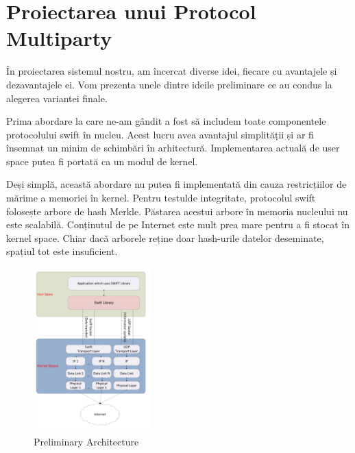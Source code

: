
\section{Proiectarea unui Protocol Multiparty}
\label{sec:multiparty:design}


În proiectarea sistemul nostru, am încercat diverse idei, fiecare cu
avantajele și dezavantajele ei. Vom prezenta unele dintre ideile
preliminare ce au condus la alegerea variantei finale.

Prima abordare la care ne-am gândit a fost să includem toate componentele
protocolului swift în nucleu. Acest lucru avea avantajul simplității și ar
fi însemnat un minim de schimbări în arhitectură. Implementarea actuală de
user space putea fi portată ca un modul de kernel.

Deși simplă, această abordare nu putea fi implementată din cauza
restricțiilor de mărime a memoriei în kernel. Pentru testulde integritate,
protocolul swift folosește arbore de hash Merkle. Păstarea acestui arbore
în memoria nucleului nu este scalabilă. Conținutul de pe Internet este mult
prea mare pentru a fi stocat în kernel space. Chiar dacă arborele reține
doar hash-urile datelor deseminate, spațiul tot este insuficient.

\begin{figure}
  \centering
  \includegraphics[width=0.4\textwidth]{src/img/multiparty/preliminary-architecture}
  \caption{Preliminary Architecture}
  \label{fig:multiparty:preliminary-architecture}
\end{figure}

